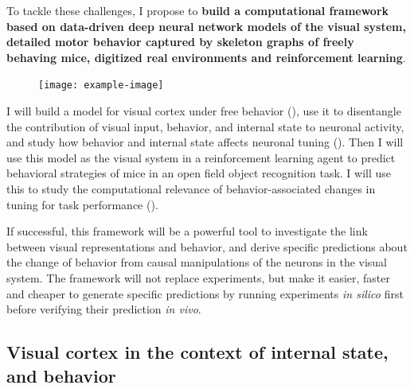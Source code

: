 \documentclass[B2,COG]{ercgrant}
\begin{document}
To tackle these challenges, I propose to \textbf{build a computational framework based on data-driven deep neural network models of the visual system, detailed motor behavior captured by skeleton graphs of freely behaving mice, digitized real environments and reinforcement learning}.

\begin{figure}[b]
\texttt{[image: example-image]}
\end{figure}

I will build a model for visual cortex under free behavior (), use it to disentangle the contribution of visual input, behavior, and internal state to neuronal activity, and study how behavior and internal state affects neuronal tuning (). Then I will use this model as the visual system in a reinforcement learning agent to predict behavioral strategies of mice in an open field object recognition task. I will use this to study the computational relevance of behavior-associated changes in tuning for task performance ().

If successful, this framework will be a powerful tool to investigate the link between visual representations and behavior, and derive specific predictions about the change of behavior from causal manipulations of the neurons in the visual system.
The framework will not replace experiments, but make it easier, faster and cheaper to generate specific predictions by running experiments \textit{in silico} first before verifying their prediction \textit{in vivo}. 










\subsection{Visual cortex in the context of internal state, and behavior}
\end{document}
